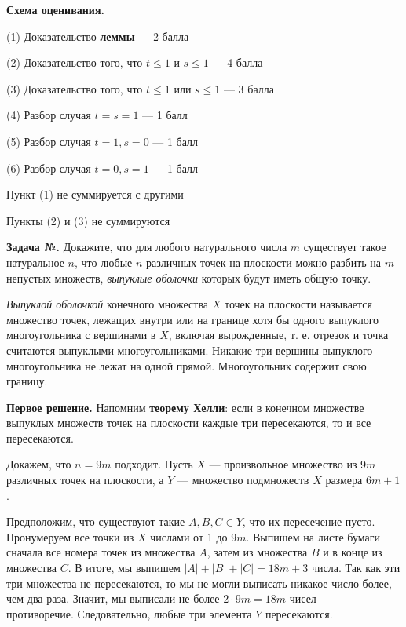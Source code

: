 \documentclass[12pt]{article}
\newcounter{zadacha}
\newcommand{\z}{\par  \smallskip \noindent \refstepcounter{zadacha}%
\textbf{Задача №\arabic{zadacha}.} }
\def\solI{\noindent \textbf{Первое решение. }}
\begin{document}
\bigskip

\textbf{Схема оценивания.}
\begin{compactitem}
\item (1) Доказательство \textbf{леммы} --- 2 балла
\item (2) Доказательство того, что $t \leq 1$ и $s \leq 1$ --- 4 балла
\item (3) Доказательство того, что $t \leq 1$ или $s \leq 1$ --- 3 балла
\item (4) Разбор случая $t = s = 1$ --- 1 балл
\item (5) Разбор случая $t = 1, s = 0$ --- 1 балл
\item (6) Разбор случая $t = 0, s = 1$ --- 1 балл
\item Пункт (1) не суммируется с другими
\item Пункты (2) и (3) не суммируются
\end{compactitem}

\bigskip

\z  Докажите, что для любого натурального числа $m$ существует такое натуральное $n$, что любые $n$ различных точек на плоскости можно разбить на $m$ непустых множеств, \textit{выпуклые оболочки} которых будут иметь общую точку.

\textit{Выпуклой оболочкой} конечного множества $X$ точек на плоскости называется множество точек, лежащих внутри или на границе хотя бы одного выпуклого многоугольника с вершинами в $X$, включая вырожденные, т. е. отрезок и точка считаются выпуклыми многоугольниками. Никакие три вершины выпуклого многоугольника не лежат на одной прямой. Многоугольник содержит свою границу. %

\bigskip

\solI Напомним \textbf{теорему Хелли}: если в конечном множестве выпуклых множеств точек на плоскости каждые три пересекаются, то и все пересекаются.

Докажем, что $n = 9m$ подходит. Пусть $X$ --- произвольное множество из $9m$ различных точек на плоскости, а $Y$ --- множество подмножеств $X$ размера $6m + 1$. 

Предположим, что существуют такие $A, B, C \in Y$, что их пересечение пусто. Пронумеруем все точки из $X$ числами от 1 до $9m$. Выпишем на листе бумаги сначала все номера точек из множества $A$, затем из множества $B$ и в конце из множества $C$. В итоге, мы выпишем $|A| + |B| + |C| = 18m + 3$ числа. Так как эти три множества не пересекаются, то мы не могли выписать никакое число более, чем два раза. Значит, мы выписали не более $2 \cdot 9m = 18m$ чисел --- противоречие. Следовательно, любые три элемента $Y$ пересекаются.
\end{document}
